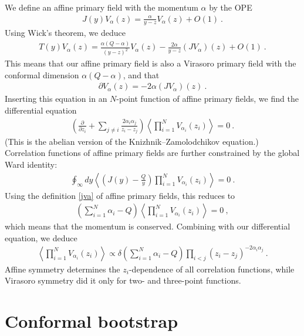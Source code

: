 \documentclass[12pt, a4paper]{article}
\theoremstyle{break}
\begin{document}
We define an affine primary field with the momentum $\alpha$ by the OPE 
\begin{align}
 J(y) V_\alpha(z) = \frac{\alpha}{y-z} V_\alpha(z) + O(1)\ .
\label{jva}
\end{align}
Using Wick's theorem, we deduce 
\begin{align}
 T(y) V_\alpha(z) = \frac{\alpha(Q-\alpha) }{(y-z)^2}V_\alpha(z) - \frac{2\alpha}{y-z} (JV_\alpha)(z) + O(1)\ . 
\end{align}
This means that our affine primary field is also a Virasoro primary field with the conformal dimension $\alpha(Q-\alpha)$, and that 
\begin{align}
 \partial V_\alpha(z) = -2\alpha (JV_\alpha)(z)\ .
\end{align}
Inserting this equation in an $N$-point function of affine primary fields, we find the differential equation
\begin{align}
\left( {\frac{\partial}{\partial z_i}} +\sum_{j\neq i} \frac{2\alpha_i\alpha_j}{z_i-z_j} \right) \left\langle \prod_{i=1}^N V_{\alpha_i}(z_i) \right\rangle = 0 \ .
\label{kzl}
\end{align}
(This is the abelian version of the Knizhnik--Zamolodchikov equation.) Correlation functions of affine primary fields are further constrained by the global Ward identity: 
\begin{align}
 \oint_\infty dy \left< \left(J(y)-\frac{Q}{y}\right) \prod_{i=1}^N V_{\alpha_i}(z_i)\right> = 0\ .
\end{align}
Using the definition \eqref{jva} of affine primary fields, this reduces to 
\begin{align}
 \left(\textstyle\sum_{i=1}^N \alpha_i - Q\right) \left\langle \prod_{i=1}^N V_{\alpha_i}(z_i) \right\rangle = 0 \ ,
\end{align}
which means that the momentum is conserved. Combining with our differential equation, we deduce
\begin{align}
 \left\langle \prod_{i=1}^N V_{\alpha_i}(z_i) \right\rangle \propto \delta\left(\textstyle\sum_{i=1}^N \alpha_i - Q\right) \prod_{i<j} (z_i-z_j)^{-2\alpha_i\alpha_j}\ .
\end{align}
Affine symmetry determines the $z_i$-dependence of all correlation functions, while Virasoro symmetry did it only for two- and three-point functions. 

\section{Conformal bootstrap}
\end{document}
